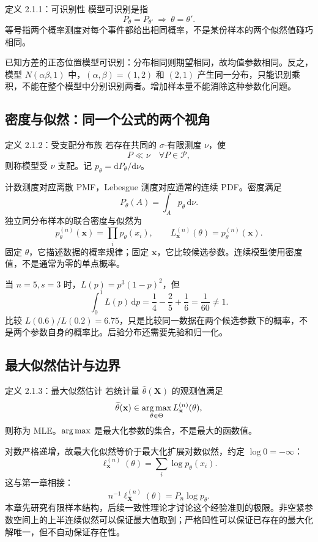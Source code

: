 \begin{definitionbox}{定义 2.1.1：可识别性}
模型可识别是指
\[
 P_\theta=P_{\theta'}\ \Longrightarrow\ \theta=\theta'.
\]
等号指两个概率测度对每个事件都给出相同概率，不是某份样本的两个似然值碰巧相同。
\end{definitionbox}

已知方差的正态位置模型可识别：分布相同则期望相同，故均值参数相同。反之，模型 $N(\alpha\beta,1)$ 中，$(\alpha,\beta)=(1,2)$ 和 $(2,1)$ 产生同一分布，只能识别乘积，不能在整个模型中分别识别两者。增加样本量不能消除这种参数化问题。

\subsection{密度与似然：同一个公式的两个视角}
\begin{definitionbox}{定义 2.1.2：受支配分布族}
若存在共同的 $\sigma$-有限测度 $\nu$，使
\[
 P\ll\nu\quad\forall P\in\mathcal P,
\]
则称模型受 $\nu$ 支配。记 $p_\theta=\mathrm dP_\theta/\mathrm d\nu$。
\end{definitionbox}

计数测度对应离散 PMF，Lebesgue 测度对应通常的连续 PDF。密度满足
\[
 P_\theta(A)=\int_Ap_\theta\,\mathrm d\nu.
\]
独立同分布样本的联合密度与似然为
\[
 p_\theta^{(n)}(\mathbf x)=\prod_i p_\theta(x_i),
 \qquad L_{\mathbf x}^{(n)}(\theta)=p_\theta^{(n)}(\mathbf x).
\]
固定 $\theta$，它描述数据的概率规律；固定 $\mathbf x$，它比较候选参数。连续模型使用密度值，不是通常为零的单点概率。

\begin{notebox}[似然不是参数的概率分布]
当 $n=5,s=3$ 时，$L(p)=p^3(1-p)^2$，但
\[
 \int_0^1L(p)\,\mathrm dp
 =\frac14-\frac25+\frac16=\frac1{60}\ne1.
\]
比较 $L(0.6)/L(0.2)=6.75$，只是比较同一数据在两个候选参数下的概率，不是两个参数自身的概率比。后验分布还需要先验和归一化。
\end{notebox}

\subsection{最大似然估计与边界}
\begin{definitionbox}{定义 2.1.3：最大似然估计}
若统计量 $\widehat\theta(\mathbf X)$ 的观测值满足
\[
 \widehat\theta(\mathbf x)\in\operatorname*{arg\,max}_{\theta\in\Theta}L_{\mathbf x}^{(n)}(\theta),
\]
则称为 MLE。$\operatorname*{arg\,max}$ 是最大化参数的集合，不是最大的函数值。
\end{definitionbox}

对数严格递增，故最大化似然等价于最大化扩展对数似然，约定 $\log0=-\infty$：
\[
 \ell_{\mathbf x}^{(n)}(\theta)=\sum_i\log p_\theta(x_i).
\]
这与第一章相接：
\[
 n^{-1}\ell_{\mathbf X}^{(n)}(\theta)=P_n\log p_\theta.
\]
本章先研究有限样本结构，后续一致性理论才讨论这个经验准则的极限。非空紧参数空间上的上半连续似然可以保证最大值取到；严格凹性可以保证已存在的最大化解唯一，但不自动保证存在性。

